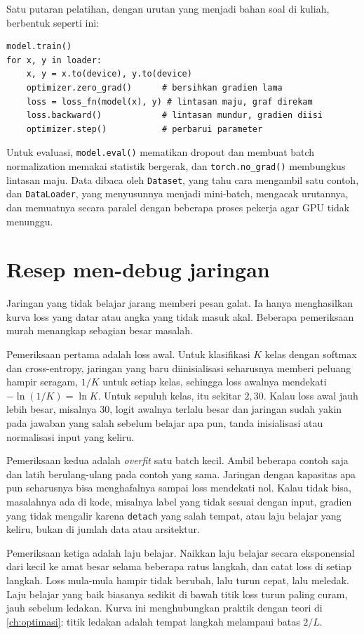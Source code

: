 Satu putaran pelatihan, dengan urutan yang menjadi bahan soal di kuliah, berbentuk seperti ini:
\begin{verbatim}
model.train()
for x, y in loader:
    x, y = x.to(device), y.to(device)
    optimizer.zero_grad()      # bersihkan gradien lama
    loss = loss_fn(model(x), y) # lintasan maju, graf direkam
    loss.backward()            # lintasan mundur, gradien diisi
    optimizer.step()           # perbarui parameter
\end{verbatim}
Untuk evaluasi, \texttt{model.eval()} mematikan dropout dan membuat batch normalization memakai statistik bergerak, dan
\texttt{torch.no\_grad()} membungkus lintasan maju. Data dibaca oleh \texttt{Dataset}, yang tahu cara mengambil satu contoh, dan
\texttt{DataLoader}, yang menyusunnya menjadi mini-batch, mengacak urutannya, dan memuatnya secara paralel dengan beberapa
proses pekerja agar GPU tidak menunggu.

\section{Resep men-debug jaringan}

Jaringan yang tidak belajar jarang memberi pesan galat. Ia hanya menghasilkan kurva loss yang datar atau angka yang tidak masuk
akal. Beberapa pemeriksaan murah menangkap sebagian besar masalah.

Pemeriksaan pertama adalah loss awal. Untuk klasifikasi $K$ kelas dengan softmax dan cross-entropy, jaringan yang baru
diinisialisasi seharusnya memberi peluang hampir seragam, $1/K$ untuk setiap kelas, sehingga loss awalnya mendekati
$-\ln(1/K)=\ln K$. Untuk sepuluh kelas, itu sekitar $2{,}30$. Kalau loss awal jauh lebih besar, misalnya 30, logit awalnya terlalu
besar dan jaringan sudah yakin pada jawaban yang salah sebelum belajar apa pun, tanda inisialisasi atau normalisasi input
yang keliru.

Pemeriksaan kedua adalah \emph{overfit} satu batch kecil. Ambil beberapa contoh saja dan latih berulang-ulang pada contoh yang
sama. Jaringan dengan kapasitas apa pun seharusnya bisa menghafalnya sampai loss mendekati nol. Kalau tidak bisa, masalahnya
ada di kode, misalnya label yang tidak sesuai dengan input, gradien yang tidak mengalir karena \texttt{detach} yang salah tempat,
atau laju belajar yang keliru, bukan di jumlah data atau arsitektur.

Pemeriksaan ketiga adalah laju belajar. Naikkan laju belajar secara eksponensial dari kecil ke amat besar selama
beberapa ratus langkah, dan catat loss di setiap langkah. Loss mula-mula hampir tidak berubah, lalu turun cepat, lalu meledak.
Laju belajar yang baik biasanya sedikit di bawah titik loss turun paling curam, jauh sebelum ledakan. Kurva ini menghubungkan
praktik dengan teori di \cref{ch:optimasi}: titik ledakan adalah tempat langkah melampaui batas $2/L$.

